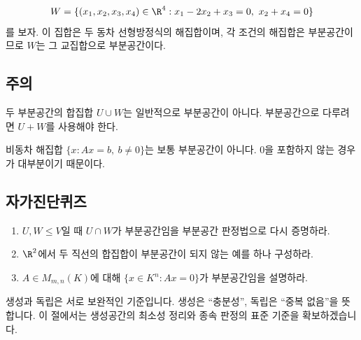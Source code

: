 \begin{example}
\[
W=\{(x_1,x_2,x_3,x_4)\in\R^4:x_1-2x_2+x_3=0,\ x_2+x_4=0\}
\]
를 보자. 이 집합은 두 동차 선형방정식의 해집합이며, 각 조건의 해집합은 부분공간이므로 $W$는 그 교집합으로 부분공간이다.
\end{example}

\subsection*{주의}
\begin{warning}
두 부분공간의 합집합 $U\cup W$는 일반적으로 부분공간이 아니다. 부분공간으로 다루려면 $U+W$를 사용해야 한다.
\end{warning}
\begin{warning}
비동차 해집합 $\{x:Ax=b,\ b\neq 0\}$는 보통 부분공간이 아니다. $0$을 포함하지 않는 경우가 대부분이기 때문이다.
\end{warning}

\subsection*{자가진단퀴즈}
\begin{enumerate}[label=\arabic*.]
\item $U,W\le V$일 때 $U\cap W$가 부분공간임을 부분공간 판정법으로 다시 증명하라.
\item $\R^2$에서 두 직선의 합집합이 부분공간이 되지 않는 예를 하나 구성하라.
\item $A\in M_{m,n}(K)$에 대해 $\{x\in K^n:Ax=0\}$가 부분공간임을 설명하라.
\end{enumerate}


생성과 독립은 서로 보완적인 기준입니다. 생성은 ``충분성'', 독립은 ``중복 없음''을 뜻합니다. 이 절에서는 생성공간의 최소성 정리와 종속 판정의 표준 기준을 확보하겠습니다.

